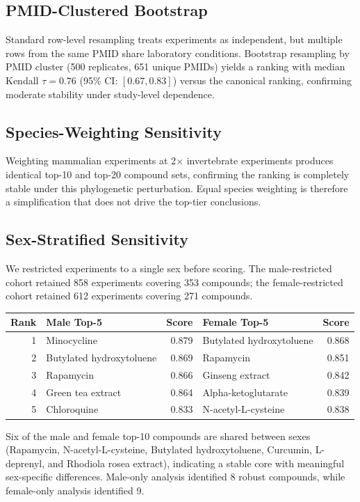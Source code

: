 \documentclass[11pt]{article}
\begin{document}
\subsection{PMID-Clustered Bootstrap}
Standard row-level resampling treats experiments as independent, but multiple rows from the same PMID share laboratory conditions. Bootstrap resampling by PMID cluster (500 replicates, 651 unique PMIDs) yields a ranking with median Kendall $\tau = 0.76$ (95\% CI: $[0.67, 0.83]$) versus the canonical ranking, confirming moderate stability under study-level dependence.

\subsection{Species-Weighting Sensitivity}
Weighting mammalian experiments at 2$\times$ invertebrate experiments produces identical top-10 and top-20 compound sets, confirming the ranking is completely stable under this phylogenetic perturbation. Equal species weighting is therefore a simplification that does not drive the top-tier conclusions.

\subsection{Sex-Stratified Sensitivity}
We restricted experiments to a single sex before scoring. The male-restricted cohort retained 858 experiments covering 353 compounds; the female-restricted cohort retained 612 experiments covering 271 compounds.

\begin{center}
\small
\begin{tabular}{r p{3.2cm} r p{3.2cm} r}
\toprule
Rank & Male Top-5 & Score & Female Top-5 & Score \\
\midrule
1 & Minocycline & 0.879 & Butylated hydroxytoluene & 0.868 \\
2 & Butylated hydroxytoluene & 0.869 & Rapamycin & 0.851 \\
3 & Rapamycin & 0.866 & Ginseng extract & 0.842 \\
4 & Green tea extract & 0.864 & Alpha-ketoglutarate & 0.839 \\
5 & Chloroquine & 0.833 & N-acetyl-L-cysteine & 0.838 \\
\bottomrule
\end{tabular}
\normalsize
\end{center}

Six of the male and female top-10 compounds are shared between sexes (Rapamycin, N-acetyl-L-cysteine, Butylated hydroxytoluene, Curcumin, L-deprenyl, and Rhodiola rosea extract), indicating a stable core with meaningful sex-specific differences. Male-only analysis identified 8 robust compounds, while female-only analysis identified 9.
\end{document}
